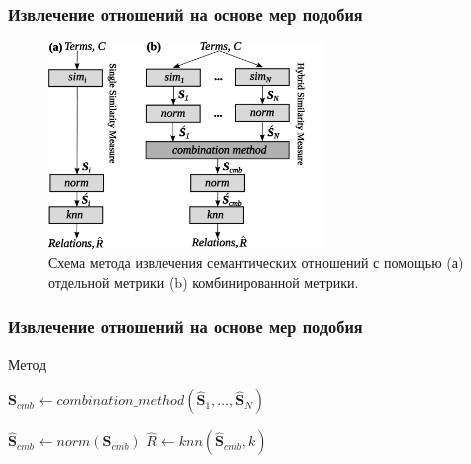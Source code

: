 \documentclass{beamer}
\begin{document}
\begin{frame}
\frametitle{Извлечение отношений на основе мер подобия}

\begin{figure}
	\centering
		\includegraphics[width=0.65\textwidth]{figures/single-and-hybrid-2}
	\caption{Схема метода извлечения семантических отношений с помощью (а) отдельной метрики (b) комбинированной метрики.}		
\end{figure}


\end{frame}

\begin{frame}
\frametitle{Извлечение отношений на основе мер подобия}

\begin{block}{Метод}

\begin{algorithm}[H]
\SetLine
{}


$\mathbf{S}_{cmb} \leftarrow combination\_method(\hat{\mathbf{S}}_1,\ldots,\hat{\mathbf{S}}_N)$ \;

$\hat{\mathbf{S}}_{cmb} \leftarrow norm(\mathbf{S}_{cmb})$ \;
$\hat{R} \leftarrow knn(\hat{\mathbf{S}}_{cmb},k)$ \;
 \;
\label{alg:unsup}
\end{algorithm}

\end{block}
\end{frame}
\end{document}
